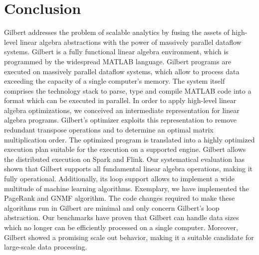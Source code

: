 \section{Conclusion}
\label{sec:conclusion}

Gilbert addresses the problem of scalable analytics by fusing the assets of high-level linear algebra abstractions with the power of massively parallel dataflow systems. Gilbert is a fully functional linear algebra environment, which is programmed by the widespread MATLAB language. Gilbert programs are executed on massively parallel dataflow systems, which allow to process data exceeding the capacity of a single computer's memory. The system itself comprises the technology stack to parse, type and compile MATLAB code into a format which can be executed in parallel. In order to apply high-level linear algebra optimizations, we conceived an intermediate representation for linear algebra programs. Gilbert's optimizer exploits this representation to remove redundant transpose operations and to determine an optimal matrix multiplication order. The optimized program is translated into a highly optimized execution plan suitable for the execution on a supported engine. Gilbert allows the distributed execution on Spark and Flink. Our systematical evaluation has shown that Gilbert supports all fundamental linear algebra operations, making it fully operational.
Additionally, its loop support allows to implement a wide multitude of machine learning algorithms.
Exemplary, we have implemented the PageRank and GNMF algorithm.
The code changes required to make these algorithms run in Gilbert are minimal and only concern Gilbert's loop abstraction.
Our benchmarks have proven that Gilbert can handle data sizes which no longer can be efficiently processed on a single computer.
Moreover, Gilbert showed a promising scale out behavior, making it a suitable candidate for large-scale data processing.

